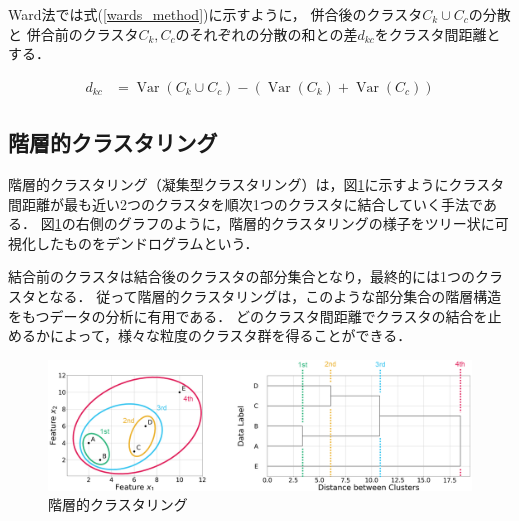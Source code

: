 \documentclass[12pt,a4j,dvipdfmx]{jreport}
\begin{document}
\newpage

Ward法では式(\ref{wards_method})に示すように，
併合後のクラスタ$C_{k} \cup C_{c}$の分散と
併合前のクラスタ$C_{k}, C_{c}$のそれぞれの分散の和との差$d_{k c}$をクラスタ間距離とする．


\begin{align}
  d_{k c} &= \operatorname{Var} \left( C_{k} \cup C_{c} \right)
  -
  \left(
    \operatorname{Var}\left(C_{k}\right)
    +
    \operatorname{Var}\left(C_{c}\right)
  \right)
  \label{wards_method}
\end{align}



\subsection{階層的クラスタリング}
\label{subsection_hierarchical_clustering}
階層的クラスタリング（凝集型クラスタリング）は，図\ref{fig_clustering_example}に示すようにクラスタ間距離が最も近い2つのクラスタを順次1つのクラスタに結合していく手法である．
図\ref{fig_clustering_example}の右側のグラフのように，階層的クラスタリングの様子をツリー状に可視化したものをデンドログラムという．

結合前のクラスタは結合後のクラスタの部分集合となり，最終的には1つのクラスタとなる．
従って階層的クラスタリングは，このような部分集合の階層構造をもつデータの分析に有用である．
どのクラスタ間距離でクラスタの結合を止めるかによって，様々な粒度のクラスタ群を得ることができる．

\begin{figure}[H]
	\centering
	\includegraphics[keepaspectratio, width=120mm]{img/clustering_example.png}
	\caption{階層的クラスタリング}
	\label{fig_clustering_example}
\end{figure}
\end{document}
